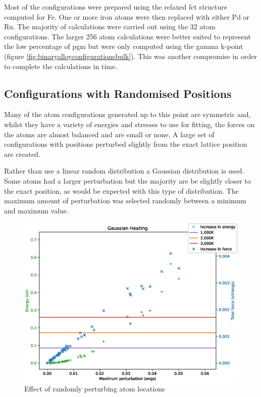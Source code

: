 Most of the configurations were prepared using the relaxed \acrshort{fct} structure computed for Fe.  One or more iron atoms were then replaced with either Pd or Ru.  The majority of calculations were carried out using the 32 atom configurations.  The larger 256 atom calculations were better suited to represent the low percentage of \acrshort{pgm} but were only computed using the gamma k-point (figure \ref{fig:binaryalloyconfigurationsbulk}).  This was another compromise in order to complete the calculations in time.



\subsection{Configurations with Randomised Positions}

Many of the atom configurations generated up to this point are symmetric and, whilst they have a variety of energies and stresses to use for fitting, the forces on the atoms are almost balanced and are small or none.  A large set of configurations with positions perturbed slightly from the exact lattice position are created.

Rather than use a linear random distribution a Gaussian distribution is used.  Some atoms had a larger perturbation but the majority are be slightly closer to the exact position, as would be expected with this type of distribution.  The maximum amount of perturbation was selected randomly between a minimum and maximum value.  

\begin{figure}[h]
\begin{center}
\includegraphics[scale=0.45]{chapters/potentials_fe_pd_ru/pwheat/al/alheat.eps}
\caption{Effect of randomly perturbing atom locations}
\label{fig:pwheatal}
\end{center}
\end{figure}


